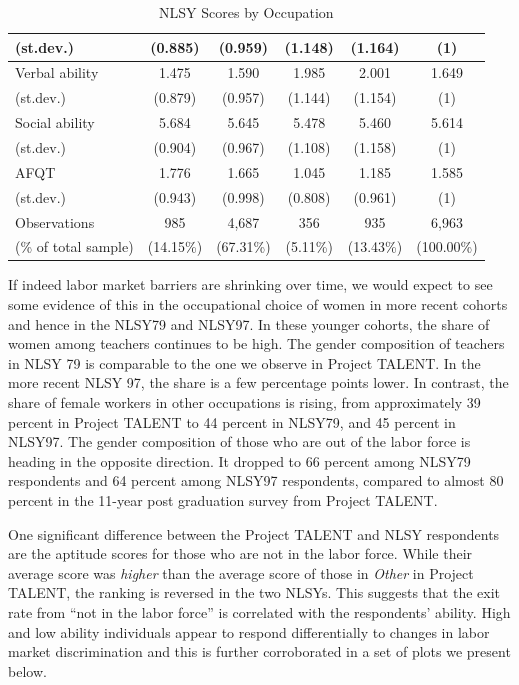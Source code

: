 \documentclass[onehalfspacing,11pt]{article}
\begin{document}
\begin{table}[h!]
\begin{tabular}{lccccc}
			\quad (st.dev.) & (0.885) & (0.959) & (1.148) & (1.164) & (1)\\
			\midrule
			Verbal ability & 1.475 & 1.590 & 1.985 & 2.001 &  1.649\\
			\quad (st.dev.) & (0.879) & (0.957) & (1.144) & (1.154) & (1)\\
			\midrule
			Social ability & 5.684 & 5.645 & 5.478 & 5.460 & 5.614\\
			\quad (st.dev.) & (0.904) & (0.967) & (1.108) & (1.158) & (1)\\
			\midrule
			AFQT & 1.776 & 1.665 & 1.045 & 1.185 & 1.585\\
			\quad (st.dev.) & (0.943) & (0.998) & (0.808) & (0.961) & (1)\\
			\midrule
			Observations &  985 & 4,687 &  356 & 935 & 6,963\\
			\quad (\% of total sample) & (14.15\%) & (67.31\%) & (5.11\%) & (13.43\%) & (100.00\%)\\
			\bottomrule
		\end{tabular}
		\caption{NLSY Scores by Occupation}
		\label{tab:NLSYscores}
	\end{table}
	
If indeed labor market barriers are shrinking over time, we would expect to see some evidence of this in the occupational choice of women in more recent cohorts and hence in the NLSY79 and NLSY97. In these younger cohorts, the share of women among teachers continues to be high. The gender composition of teachers in NLSY 79 is comparable to the one we observe in Project TALENT. In the more recent NLSY 97, the share is a few percentage points lower. In contrast, the share of female workers in other occupations is rising, from approximately 39 percent in Project TALENT to 44 percent in NLSY79, and 45 percent in NLSY97. The gender composition of those who are out of the labor force is heading in the opposite direction. It dropped to 66 percent among NLSY79 respondents and 64 percent among NLSY97 respondents, compared to almost 80 percent in the 11-year post graduation survey from Project TALENT.

One significant difference between the Project TALENT and NLSY respondents are the aptitude scores for those who are not in the labor force. While their average score was {\it higher} than the average score of those in {\it Other} in Project TALENT, the ranking is reversed in the two NLSYs. This suggests that the exit rate from ``not in the labor force'' is correlated with the respondents' ability. High and low ability individuals appear to respond differentially to changes in labor market discrimination and this is further corroborated in a set of plots we present below. 
\end{document}
